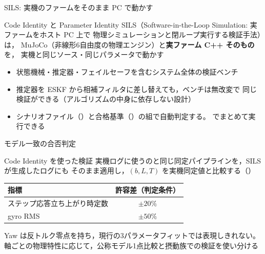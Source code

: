 \begin{frame}{SILS: 実機のファームをそのまま PC で動かす}
  \begin{block}{Code Identity と Parameter Identity}\small
    SILS（Software-in-the-Loop Simulation: 実ファームをホスト PC 上で
    物理シミュレーションと閉ループ実行する検証手法）は，
    MuJoCo（非線形6自由度の物理エンジン）と\textbf{実ファーム C++ そのもの}を，
    実機と同じソース・同じパラメータで動かす
  \end{block}

  \vspace{0.5em}

  \begin{itemize}\small
    \item 状態機械・推定器・フェイルセーフを含むシステム全体の検証ベンチ
    \item 推定器を ESKF から相補フィルタに差し替えても，ベンチは無改変で
          同じ検証ができる（アルゴリズムの中身に依存しない設計）
    \item シナリオファイル（）と合格基準（）の組で自動判定する。
           でまとめて実行できる
  \end{itemize}
\end{frame}

\begin{frame}{モデル一致の合否判定}
  \begin{block}{Code Identity を使った検証}\small
    実機ログに使うのと同じ同定パイプラインを，SILS が生成したログにも
    そのまま適用し，$(b, L, T)$ を実機同定値と比較する（）
  \end{block}

  \vspace{0.5em}

  \begin{table}
    \centering\footnotesize
    \begin{tabular}{lc}
      \hline
      \textbf{指標} & \textbf{許容差（判定条件）} \\
      \hline
      ステップ応答立ち上がり時定数 & $\pm20\%$ \\
      gyro RMS & $\pm50\%$ \\
      \hline
    \end{tabular}
  \end{table}

  {\footnotesize Yaw は反トルク零点を持ち，現行の3パラメータフィットでは表現しきれない。
  軸ごとの物理特性に応じて，公称モデル1点比較と摂動族での検証を使い分ける}
\end{frame}

